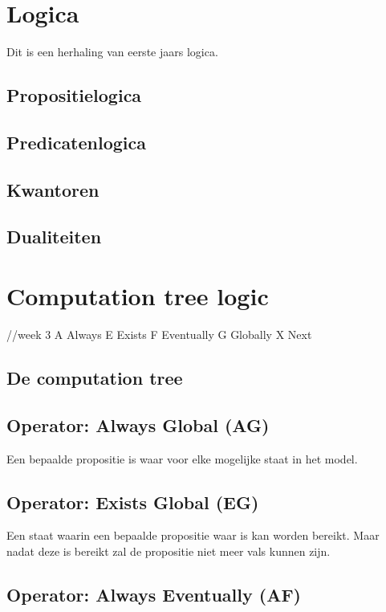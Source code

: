 \documentclass{article}
\begin{document}
\section{Logica}

Dit is een herhaling van eerste jaars logica.

\subsection{Propositielogica}

\subsection{Predicatenlogica}

\subsection{Kwantoren}

\subsection{Dualiteiten}

\section{Computation tree logic}
//week 3
A Always E Exists F Eventually G Globally X Next

\subsection{De computation tree}

\subsection{Operator: Always Global (AG)}

Een bepaalde propositie is waar voor elke mogelijke staat in het model.

\subsection{Operator: Exists Global (EG)}

Een staat waarin een bepaalde propositie waar is kan worden bereikt. Maar nadat deze is bereikt zal de propositie niet meer vals kunnen zijn.

\subsection{Operator: Always Eventually (AF)}
\end{document}
